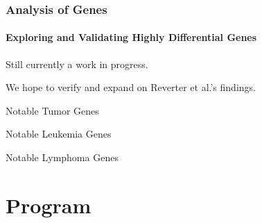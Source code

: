 \documentclass[serif]{beamer}
\begin{document}
	\begin{frame}[t]
		\frametitle{Analysis of Genes}
		\framesubtitle{Exploring and Validating Highly Differential Genes}
		\begin{block}{\vspace{-0.5in}}
			\alert{Still currently a work in progress.}
		\end{block}
		We hope to verify and expand on Reverter et al.'s findings.
		
		{
			\begin{block}{Notable Tumor Genes}
				
			\end{block}
		}
		
		{
			\begin{block}{Notable Leukemia Genes}
				
			\end{block}
		}
		
		{
			\begin{block}{Notable Lymphoma Genes}
				
			\end{block}
		}
	\end{frame}	
	
	\section{Program}
	
\end{document}
